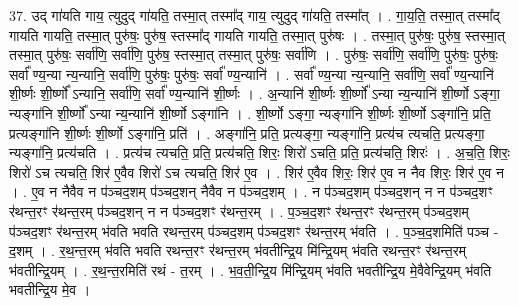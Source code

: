 \documentclass[17pt]{extarticle}
\begin{document}
37. उद् गा॑यति गाय॒ त्युदुद् गा॑यति॒ तस्मा॒त् तस्मा᳚द् गाय॒ त्युदुद् गा॑यति॒ तस्मा᳚त् । . गा॒य॒ति॒ तस्मा॒त् तस्मा᳚द् गायति गायति॒ तस्मा॒त् पुरु॑षः॒ पुरु॑ष॒ स्तस्मा᳚द् गायति गायति॒ तस्मा॒त् पुरु॑षः । . तस्मा॒त् पुरु॑षः॒ पुरु॑ष॒ स्तस्मा॒त् तस्मा॒त् पुरु॑षः॒ सर्वा॑णि॒ सर्वा॑णि॒ पुरु॑ष॒ स्तस्मा॒त् तस्मा॒त् पुरु॑षः॒ सर्वा॑णि । . पुरु॑षः॒ सर्वा॑णि॒ सर्वा॑णि॒ पुरु॑षः॒ पुरु॑षः॒ सर्वा᳚ ण्य॒न्या न्य॒न्यानि॒ सर्वा॑णि॒ पुरु॑षः॒ पुरु॑षः॒ सर्वा᳚ ण्य॒न्यानि॑ । . सर्वा᳚ ण्य॒न्या न्य॒न्यानि॒ सर्वा॑णि॒ सर्वा᳚ ण्य॒न्यानि॑ शी॒र्ष्णः शी॒र्ष्णो᳚ ऽन्यानि॒ सर्वा॑णि॒ सर्वा᳚ ण्य॒न्यानि॑ शी॒र्ष्णः । . अ॒न्यानि॑ शी॒र्ष्णः शी॒र्ष्णो᳚ ऽन्या न्य॒न्यानि॑ शी॒र्ष्णो ऽङ्गा॒ न्यङ्गा॑नि शी॒र्ष्णो᳚ ऽन्या न्य॒न्यानि॑ शी॒र्ष्णो ऽङ्गा॑नि । . शी॒र्ष्णो ऽङ्गा॒ न्यङ्गा॑नि शी॒र्ष्णः शी॒र्ष्णो ऽङ्गा॑नि॒ प्रति॒ प्रत्यङ्गा॑नि शी॒र्ष्णः शी॒र्ष्णो ऽङ्गा॑नि॒ प्रति॑ । . अङ्गा॑नि॒ प्रति॒ प्रत्यङ्गा॒ न्यङ्गा॑नि॒ प्रत्य॑च त्यचति॒ प्रत्यङ्गा॒ न्यङ्गा॑नि॒ प्रत्य॑चति । . प्रत्य॑च त्यचति॒ प्रति॒ प्रत्य॑चति॒ शिरः॒ शिरो॑ ऽचति॒ प्रति॒ प्रत्य॑चति॒ शिरः॑ । . अ॒च॒ति॒ शिरः॒ शिरो॑ ऽच त्यचति॒ शिर॑ ए॒वैव शिरो॑ ऽच त्यचति॒ शिर॑ ए॒व । . शिर॑ ए॒वैव शिरः॒ शिर॑ ए॒व न नैव शिरः॒ शिर॑ ए॒व न । . ए॒व न नैवैव न प॑ञ्चद॒शम् प॑ञ्चद॒शन् नैवैव न प॑ञ्चद॒शम् । . न प॑ञ्चद॒शम् प॑ञ्चद॒शन् न न प॑ञ्चद॒शꣳ र॑थन्त॒रꣳ र॑थन्त॒रम् प॑ञ्चद॒शन् न न प॑ञ्चद॒शꣳ र॑थन्त॒रम् । . प॒ञ्च॒द॒शꣳ र॑थन्त॒रꣳ र॑थन्त॒रम् प॑ञ्चद॒शम् प॑ञ्चद॒शꣳ र॑थन्त॒रम् भ॑वति भवति रथन्त॒रम् प॑ञ्चद॒शम् प॑ञ्चद॒शꣳ र॑थन्त॒रम् भ॑वति । . प॒ञ्च॒द॒शमिति॑ पञ्च - द॒शम् । . र॒थ॒न्त॒रम् भ॑वति भवति रथन्त॒रꣳ र॑थन्त॒रम् भ॑वतीन्द्रि॒य मि॑न्द्रि॒यम् भ॑वति रथन्त॒रꣳ र॑थन्त॒रम् भ॑वतीन्द्रि॒यम् । . र॒थ॒न्त॒रमिति॑ रथं - त॒रम् । . भ॒व॒ती॒न्द्रि॒य मि॑न्द्रि॒यम् भ॑वति भवतीन्द्रि॒य मे॒वैवेन्द्रि॒यम् भ॑वति भवतीन्द्रि॒य मे॒व । \newline
\end{document}

